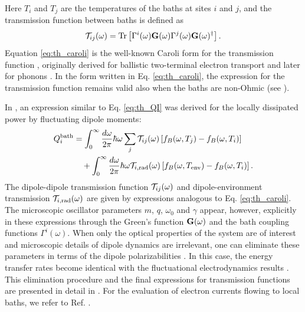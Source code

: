 Here $T_i$ and $T_j$ are the temperatures of the baths at sites $i$ and $j$, and the transmission function between baths is defined as
\begin{equation}
 \mathcal{T}_{ij}(\omega) = \textrm{Tr}\left[\Gamma^i(\omega) \mathbf{G}(\omega) \Gamma^j(\omega) \mathbf{G}(\omega)^{\dagger} \right]. \label{eq:th_caroli}
\end{equation}
Equation \eqref{eq:th_caroli} is the well-known Caroli form for the transmission function \cite{caroli71}, originally derived for ballistic two-terminal electron transport and later for phonons \cite{mingo06,yamamoto06}. In the form written in Eq. \eqref{eq:th_caroli}, the expression for the transmission function remains valid also when the baths are non-Ohmic (see ). 

In , an expression similar to Eq. \eqref{eq:th_QI} was derived for the locally dissipated power by fluctuating dipole moments:
\begin{alignat}{2}
 Q_i^{\textrm{bath}} &= \int_0^{\infty}\frac{d\omega}{2\pi} \hbar\omega \sum_{j} \mathcal{T}_{ij}(\omega) \left[f_B(\omega,T_j)-f_B(\omega,T_i ) \right] \notag \\
  & \quad + \int_0^{\infty} \frac{d\omega}{2\pi} \hbar \omega \mathcal{T}_{i,\textrm{rad}}(\omega)\left[ f_B(\omega,T_{\textrm{env}})-f_B(\omega,T_i)\right].
\end{alignat}
The dipole-dipole transmission function $\mathcal{T}_{ij}(\omega)$ and dipole-environment transmission $\mathcal{T}_{i,\textrm{rad}}(\omega)$ are given by expressions analogous to Eq. \eqref{eq:th_caroli}. The microscopic oscillator parameters $m$, $q$, $\omega_0$ and $\gamma$ appear, however, explicitly in these expressions through the Green's function $\mathbf{G}(\omega)$ and the bath coupling functions $\Gamma^i(\omega)$. When only the optical properties of the system are of interest and microscopic details of dipole dynamics are irrelevant, one can eliminate these parameters in terms of the dipole polarizabilities \cite{rosa10,rosa11}. In this case, the energy transfer rates become identical with the fluctuational electrodynamics results \cite{benabdallah11,messina13}. This elimination procedure and the final expressions for transmission functions are presented in detail in . For the evaluation of electron currents flowing to local baths, we refer to Ref. \cite{roy07}.





